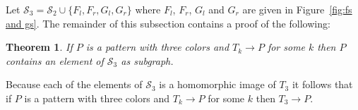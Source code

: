 \documentclass[a4paper]{article}
\newcommand{\subpatterns}{\mathcal{S}}
\newtheorem{theorem}{Theorem}[section]
\begin{document}
Let $\subpatterns_3 = \subpatterns_2 \cup \{F_l,F_r,G_l,G_r\}$ where
$F_l$, $F_r$, $G_l$ and $G_r$ are given in Figure~\ref{fig:fs and gs}. The
remainder of this subsection contains a proof of the following:
\begin{theorem}
 If $P$ is a pattern with three colors and $T_k \to P$ for some $k$ then
$P$ contains an element of $\subpatterns_3$ as subgraph.
\end{theorem}
Because each of the elements of $\subpatterns_3$ is a homomorphic image
of $T_3$ it follows that if $P$ is a pattern with three colors and $T_k
\to P$ for some $k$ then $T_3 \to P$.
\end{document}
